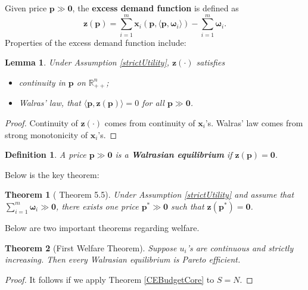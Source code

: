 \documentclass[openany]{book}
\newtheorem{definition}{Definition}[chapter]
\newtheorem{theorem}{Theorem}[chapter]
\newtheorem{lemma}{Lemma}[chapter]
\theoremstyle{remark}
\begin{document}
Given price $\boldsymbol{p}\gg \mathbf{0}$, the \textbf{excess demand function} is defined as
\begin{equation}
    \boldsymbol{z}(\boldsymbol{p})=\sum_{i=1}^{m}\boldsymbol{x}_i(\boldsymbol{p},\langle \boldsymbol{p},\boldsymbol{\omega}_i\rangle)-\sum_{i=1}^{m}\boldsymbol{\omega}_i.
\end{equation}
Properties of the excess demand function include:
\begin{lemma}
    Under Assumption \ref{strictUtility}, $\boldsymbol{z}(\cdot)$ satisfies
    \begin{itemize}
        \item continuity in $\boldsymbol{p}$ on $\mathbb{R}_{++}^n$;
        \item Walras' law, that $\langle \boldsymbol{p},\boldsymbol{z}(\boldsymbol{p})\rangle=0$ for all $\boldsymbol{p}\gg \mathbf{0}$.
    \end{itemize}
\end{lemma}
\begin{proof}
    Continuity of $\boldsymbol{z}(\cdot)$ comes from continuity of $\boldsymbol{x}_i$'s. Walras' law comes from strong monotonicity of $\boldsymbol{x}_i$'s.
\end{proof}
\begin{definition}
    A price $\boldsymbol{p}\gg \mathbf{0}$ is a \textbf{Walrasian equilibrium} if $\boldsymbol{z}(\boldsymbol{p})=\mathbf{0}$.
\end{definition}

Below is the key theorem:
\begin{theorem}[\cite{J01} Theorem 5.5]\label{WEExistence}
    Under Assumption \ref{strictUtility} and assume that $\sum_{i=1}^{m}\boldsymbol{\omega}_i\gg \mathbf{0}$, there exists one price $\boldsymbol{p}^*\gg \mathbf{0}$ such that $\boldsymbol{z}(\boldsymbol{p}^*)=\mathbf{0}$.
\end{theorem}

Below are two important theorems regarding welfare.
\begin{theorem}[First Welfare Theorem]
    Suppose $u_i$'s are continuous and strictly increasing. Then every Walrasian equilibrium is Pareto efficient.
\end{theorem}
\begin{proof}
    It follows if we apply Theorem \ref{CEBudgetCore} to $S=N$.
\end{proof}
\end{document}
